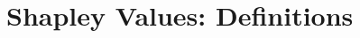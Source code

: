 \documentclass{article}
\theoremstyle{plain}
\theoremstyle{definition}
\theoremstyle{remark}
\theoremstyle{mystyle}
\begin{document}





\newpage



\newpage
\appendix
\onecolumn




%
%



%


\section{Shapley Values: Definitions}
\label{sec:shapley_def}
\end{document}
